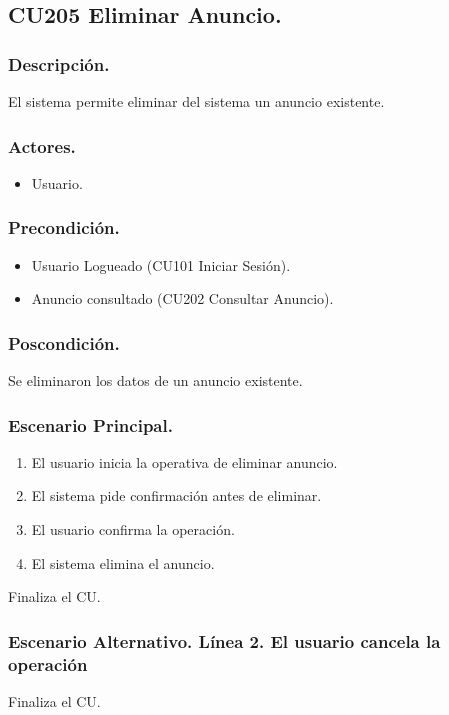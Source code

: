 \subsection{CU205 Eliminar Anuncio.}
\subsubsection{Descripci\'{o}n.}
El sistema permite eliminar del sistema un anuncio existente.
\subsubsection{Actores.}
\begin{itemize}
\item Usuario.
\end{itemize}
\subsubsection{Precondici\'{o}n.}
\begin{itemize}
\item Usuario Logueado (CU101 Iniciar Sesi\'{o}n).
\item Anuncio consultado (CU202 Consultar Anuncio).
\end{itemize}
\subsubsection{Poscondici\'{o}n.}
Se eliminaron los datos de un anuncio existente.
\subsubsection{Escenario Principal.}
\begin{enumerate}
\item El usuario inicia la operativa de eliminar anuncio.
\item El sistema pide confirmaci\'{o}n antes de eliminar.
\item El usuario confirma la operaci\'{o}n.
\item El sistema elimina el anuncio.
\end{enumerate}
Finaliza el CU.
\subsubsection{Escenario Alternativo. L\'{i}nea 2. El usuario cancela la operaci\'{o}n}
Finaliza el CU.